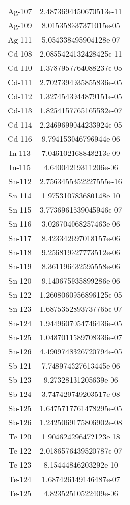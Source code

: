 \begin{table}[h!]
\begin{tabular}{|| c || c |}
Ag-107 & 2.4873694450670513e-11 \\
Ag-109 & 8.015358337371015e-05 \\
Ag-111 & 5.054338495904128e-07 \\
Cd-108 & 2.0855424132428425e-11 \\
Cd-110 & 1.3787957764088237e-05 \\
Cd-111 & 2.7027394935855836e-05 \\
Cd-112 & 1.3274543944879151e-05 \\
Cd-113 & 1.8254157765165532e-07 \\
Cd-114 & 2.2469699044233924e-05 \\
Cd-116 & 9.794153046796944e-06 \\
In-113 & 7.046102168848213e-09 \\
In-115 & 4.64004219311206e-06 \\
Sn-112 & 2.7563455352227555e-16 \\
Sn-114 & 1.975310783680148e-10 \\
Sn-115 & 3.7736961639045946e-07 \\
Sn-116 & 3.026704068257463e-06 \\
Sn-117 & 8.423342697018157e-06 \\
Sn-118 & 9.256819327773512e-06 \\
Sn-119 & 8.361196432595558e-06 \\
Sn-120 & 9.140675935899286e-06 \\
Sn-122 & 1.2608060956896125e-05 \\
Sn-123 & 1.6875352893737765e-07 \\
Sn-124 & 1.9449607054746436e-05 \\
Sn-125 & 1.0487011589708336e-07 \\
Sn-126 & 4.4909748326720794e-05 \\
Sb-121 & 7.748974327613445e-06 \\
Sb-123 & 9.27328131205639e-06 \\
Sb-124 & 3.747429749203517e-08 \\
Sb-125 & 1.6475717761478295e-05 \\
Sb-126 & 1.2425069175806902e-08 \\
Te-120 & 1.904624296472123e-18 \\
Te-122 & 2.0186576439520787e-07 \\
Te-123 & 8.15444846203292e-10 \\
Te-124 & 1.687426149146487e-07 \\
Te-125 & 4.82352510522409e-06 \\

\end{tabular}
\end{table}
